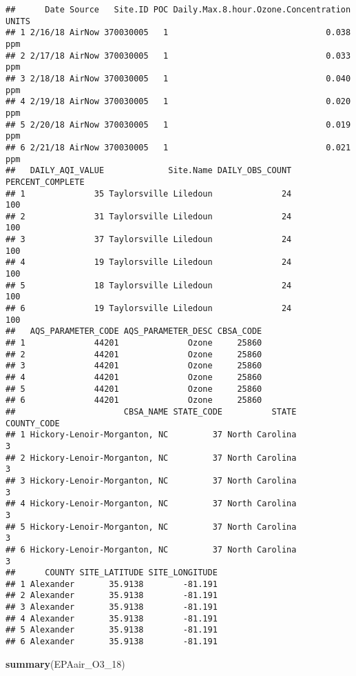 \documentclass[]{article}
\newenvironment{Shaded}{\begin{snugshade}}{\end{snugshade}}
\newcommand{\KeywordTok}[1]{\textcolor[rgb]{0.13,0.29,0.53}{\textbf{#1}}}
\newcommand{\DecValTok}[1]{\textcolor[rgb]{0.00,0.00,0.81}{#1}}
\newcommand{\NormalTok}[1]{#1}
\begin{document}
\begin{verbatim}
##      Date Source   Site.ID POC Daily.Max.8.hour.Ozone.Concentration UNITS
## 1 2/16/18 AirNow 370030005   1                                0.038   ppm
## 2 2/17/18 AirNow 370030005   1                                0.033   ppm
## 3 2/18/18 AirNow 370030005   1                                0.040   ppm
## 4 2/19/18 AirNow 370030005   1                                0.020   ppm
## 5 2/20/18 AirNow 370030005   1                                0.019   ppm
## 6 2/21/18 AirNow 370030005   1                                0.021   ppm
##   DAILY_AQI_VALUE             Site.Name DAILY_OBS_COUNT PERCENT_COMPLETE
## 1              35 Taylorsville Liledoun              24              100
## 2              31 Taylorsville Liledoun              24              100
## 3              37 Taylorsville Liledoun              24              100
## 4              19 Taylorsville Liledoun              24              100
## 5              18 Taylorsville Liledoun              24              100
## 6              19 Taylorsville Liledoun              24              100
##   AQS_PARAMETER_CODE AQS_PARAMETER_DESC CBSA_CODE
## 1              44201              Ozone     25860
## 2              44201              Ozone     25860
## 3              44201              Ozone     25860
## 4              44201              Ozone     25860
## 5              44201              Ozone     25860
## 6              44201              Ozone     25860
##                      CBSA_NAME STATE_CODE          STATE COUNTY_CODE
## 1 Hickory-Lenoir-Morganton, NC         37 North Carolina           3
## 2 Hickory-Lenoir-Morganton, NC         37 North Carolina           3
## 3 Hickory-Lenoir-Morganton, NC         37 North Carolina           3
## 4 Hickory-Lenoir-Morganton, NC         37 North Carolina           3
## 5 Hickory-Lenoir-Morganton, NC         37 North Carolina           3
## 6 Hickory-Lenoir-Morganton, NC         37 North Carolina           3
##      COUNTY SITE_LATITUDE SITE_LONGITUDE
## 1 Alexander       35.9138        -81.191
## 2 Alexander       35.9138        -81.191
## 3 Alexander       35.9138        -81.191
## 4 Alexander       35.9138        -81.191
## 5 Alexander       35.9138        -81.191
## 6 Alexander       35.9138        -81.191
\end{verbatim}

\begin{Shaded}
\begin{Highlighting}[]
\KeywordTok{summary}\NormalTok{(EPAair_O3_}\DecValTok{18}\NormalTok{)}
\end{Highlighting}
\end{Shaded}
\end{document}
